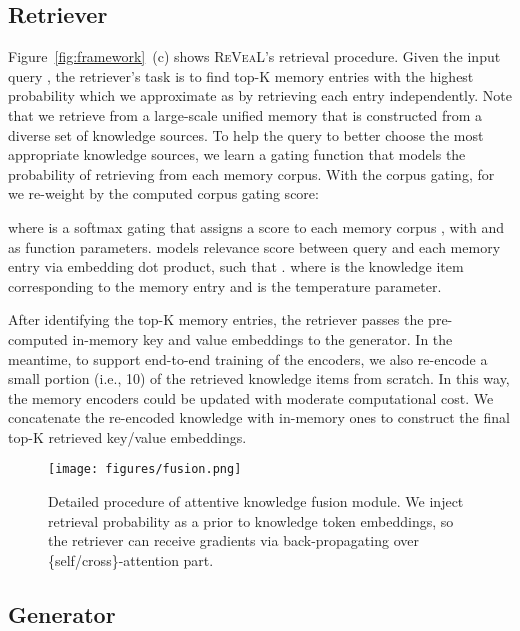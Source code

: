 \documentclass[10pt,twocolumn,letterpaper]{article}
\newcommand{\method}{R\textsc{e}V\textsc{ea}L\xspace}
\begin{document}
\subsection{Retriever} \label{sec:retrieval}
Figure~\ref{fig:framework}~(c) shows \method's retrieval procedure.
Given the input query , the retriever's task is to find top-K memory entries  with the highest probability  which we approximate as  by retrieving each entry independently.
Note that we retrieve from a large-scale unified memory  that is constructed from a diverse set of knowledge sources. To help the query to better choose the most appropriate knowledge sources, we learn a gating function that models the probability of retrieving from each memory corpus. With the corpus gating, for  we re-weight  by the computed corpus gating score:

where  is a softmax gating that assigns a score to each memory corpus ,
with  and  as function parameters. 
 models relevance score between query  and each memory entry via embedding dot product, such that . 
where  is the knowledge item corresponding to the memory entry  and  is the temperature parameter.


After identifying the top-K memory entries, the retriever passes the pre-computed in-memory key and value embeddings to the generator. In the meantime, to support end-to-end training of the encoders, we also re-encode a small portion (i.e., 10) of the retrieved knowledge items  from scratch. In this way, the memory encoders could be updated with moderate computational cost.
We concatenate the re-encoded knowledge with in-memory ones to construct the final top-K retrieved key/value embeddings.








\begin{figure}[t!]
    \centering
    \texttt{[image: figures/fusion.png]}
        \vspace{-.2in}
    \caption{Detailed procedure of attentive knowledge fusion module. We inject retrieval probability as a prior to knowledge token embeddings, so the retriever can receive gradients via back-propagating over \{self/cross\}-attention part.}
    \label{fig:fusion}
\end{figure}



\subsection{Generator} \label{sec:generation}
\end{document}
